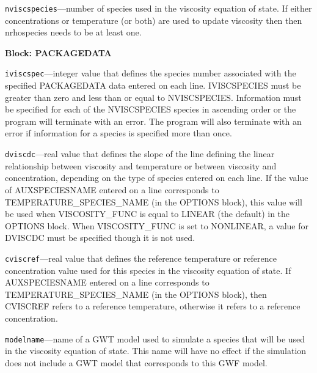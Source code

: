 \begin{description}
\item \texttt{nviscspecies}---number of species used in the viscosity equation of state.  If either concentrations or temperature (or both) are used to update viscosity then then nrhospecies needs to be at least one.

\end{description}
\item \textbf{Block: PACKAGEDATA}

\begin{description}
\item \texttt{iviscspec}---integer value that defines the species number associated with the specified PACKAGEDATA data entered on each line. IVISCSPECIES must be greater than zero and less than or equal to NVISCSPECIES. Information must be specified for each of the NVISCSPECIES species in ascending order or the program will terminate with an error.  The program will also terminate with an error if information for a species is specified more than once.

\item \texttt{dviscdc}---real value that defines the slope of the line defining the linear relationship between viscosity and temperature or between viscosity and concentration, depending on the type of species entered on each line.  If the value of AUXSPECIESNAME entered on a line corresponds to TEMPERATURE\_SPECIES\_NAME (in the OPTIONS block), this value will be used when VISCOSITY\_FUNC is equal to LINEAR (the default) in the OPTIONS block.  When VISCOSITY\_FUNC is set to NONLINEAR, a value for DVISCDC must be specified though it is not used.

\item \texttt{cviscref}---real value that defines the reference temperature or reference concentration value used for this species in the viscosity equation of state.  If AUXSPECIESNAME entered on a line corresponds to TEMPERATURE\_SPECIES\_NAME (in the OPTIONS block), then CVISCREF refers to a reference temperature, otherwise it refers to a reference concentration.

\item \texttt{modelname}---name of a GWT model used to simulate a species that will be used in the viscosity equation of state.  This name will have no effect if the simulation does not include a GWT model that corresponds to this GWF model.


\end{description}
